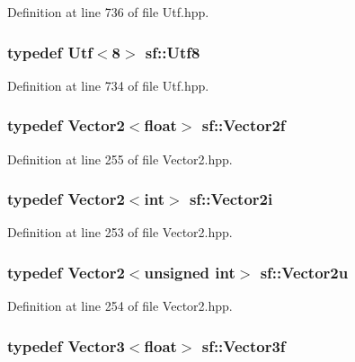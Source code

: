 Definition at line 736 of file Utf.\-hpp.

\hypertarget{namespacesf_ab78b7f576a82034d14eab92becc15301}{
\subsubsection[{Utf8}]{\setlength{\rightskip}{0pt plus 5cm}typedef {\bf Utf}$<$8$>$ {\bf sf\-::\-Utf8}}}\label{namespacesf_ab78b7f576a82034d14eab92becc15301}


Definition at line 734 of file Utf.\-hpp.

\hypertarget{namespacesf_acf03098c2577b869e2fa6836cc48f1a0}{
\subsubsection[{Vector2f}]{\setlength{\rightskip}{0pt plus 5cm}typedef {\bf Vector2}$<$float$>$ {\bf sf\-::\-Vector2f}}}\label{namespacesf_acf03098c2577b869e2fa6836cc48f1a0}


Definition at line 255 of file Vector2.\-hpp.

\hypertarget{namespacesf_ace09dd1447d74c6e9ba56ae874c094e1}{
\subsubsection[{Vector2i}]{\setlength{\rightskip}{0pt plus 5cm}typedef {\bf Vector2}$<$int$>$ {\bf sf\-::\-Vector2i}}}\label{namespacesf_ace09dd1447d74c6e9ba56ae874c094e1}


Definition at line 253 of file Vector2.\-hpp.

\hypertarget{namespacesf_aaa02ba42bf79b001a376fe9d79254cb3}{
\subsubsection[{Vector2u}]{\setlength{\rightskip}{0pt plus 5cm}typedef {\bf Vector2}$<$unsigned int$>$ {\bf sf\-::\-Vector2u}}}\label{namespacesf_aaa02ba42bf79b001a376fe9d79254cb3}


Definition at line 254 of file Vector2.\-hpp.

\hypertarget{namespacesf_af97357d7d32e7d6a700d03be2f3b4811}{
\subsubsection[{Vector3f}]{\setlength{\rightskip}{0pt plus 5cm}typedef {\bf Vector3}$<$float$>$ {\bf sf\-::\-Vector3f}}}\label{namespacesf_af97357d7d32e7d6a700d03be2f3b4811}


